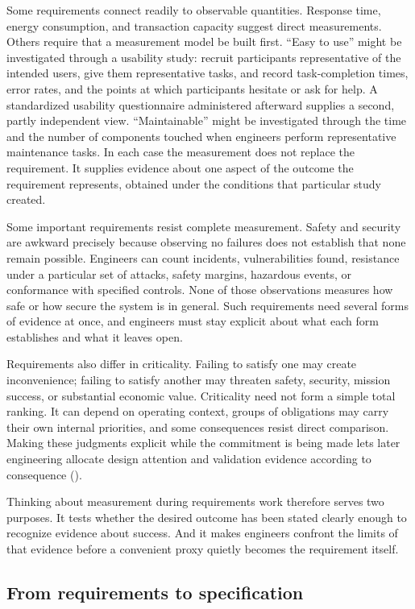 Some requirements connect readily to observable quantities. Response time, energy consumption, and
transaction capacity suggest direct measurements. Others require that a measurement model be built
first. ``Easy to use'' might be investigated through a usability study: recruit participants
representative of the intended users, give them representative tasks, and record task-completion
times, error rates, and the points at which participants hesitate or ask for help. A standardized
usability questionnaire administered afterward supplies a second, partly independent view. ``Maintainable''
might be investigated through the time and the number of components touched when engineers perform
representative maintenance tasks. In each case the measurement does not replace the requirement. It
supplies evidence about one aspect of the outcome the requirement represents, obtained under the
conditions that particular study created.

Some important requirements resist complete measurement. Safety and security are awkward precisely
because observing no failures does not establish that none remain possible. Engineers can count
incidents, vulnerabilities found, resistance under a particular set of attacks, safety margins,
hazardous events, or conformance with specified controls. None of those observations measures how
safe or how secure the system is in general. Such requirements need several forms of evidence at
once, and engineers must stay explicit about what each form establishes and what it leaves open.

Requirements also differ in criticality. Failing to satisfy one may create inconvenience; failing to
satisfy another may threaten safety, security, mission success, or substantial economic value.
Criticality need not form a simple total ranking. It can depend on operating context, groups of
obligations may carry their own internal priorities, and some consequences resist direct comparison.
Making these judgments explicit while the commitment is being made lets later engineering allocate
design attention and validation evidence according to consequence (\citet{ch-validation}).

Thinking about measurement during requirements work therefore serves two purposes. It tests whether
the desired outcome has been stated clearly enough to recognize evidence about success. And it makes
engineers confront the limits of that evidence before a convenient proxy quietly becomes the
requirement itself.

\subsection{From requirements to specification}\label{sec-to-specification}

